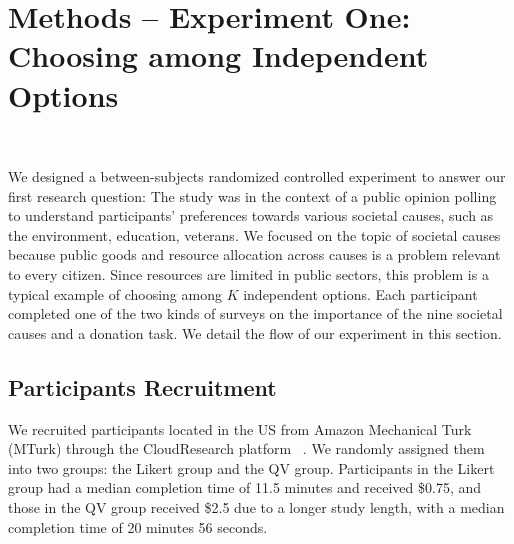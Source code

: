 \section{Methods -- Experiment One: Choosing among Independent Options}~\label{method_exp1}

We designed a between-subjects randomized controlled experiment to answer our first research question: {}The study was in the context of a public opinion polling to understand participants' preferences towards various societal causes, such as the environment, education, veterans. We focused on the topic of societal causes because public goods and resource allocation across causes is a problem relevant to every citizen. Since resources are limited in public sectors, this problem is a typical example of choosing among $K$ independent options. Each participant completed one of the two kinds of surveys on the importance of the nine societal causes and a donation task. We detail the flow of our experiment in this section.


\subsection{Participants Recruitment}
We recruited participants located in the US from Amazon Mechanical Turk (MTurk) through the CloudResearch platform~\cite{litman2017turkprime} {}. {} We randomly assigned them into two groups: the Likert group and the QV group. Participants in the Likert group had a median completion time of 11.5 minutes and received \$0.75, and those in the QV group received \$2.5 due to a longer study length, with a median completion time of 20 minutes 56 seconds.

